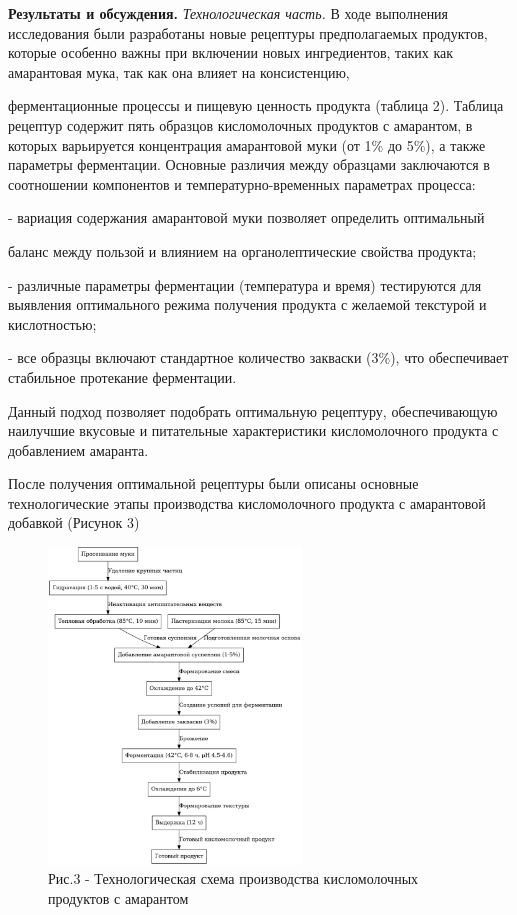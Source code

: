 \begin{multicols}{2}
{\bfseries Результаты и обсуждения.} \emph{Технологическая часть.} В ходе
выполнения исследования были разработаны новые рецептуры предполагаемых
продуктов, которые особенно важны при включении новых ингредиентов,
таких как амарантовая мука, так как она влияет на консистенцию,

ферментационные процессы и пищевую ценность продукта (таблица 2).
Таблица рецептур содержит пять образцов кисломолочных продуктов с
амарантом, в которых варьируется концентрация амарантовой муки (от 1\%
до 5\%), а также параметры ферментации. Основные различия между
образцами заключаются в соотношении компонентов и температурно-временных
параметрах процесса:

- вариация содержания амарантовой муки позволяет определить оптимальный

баланс между пользой и влиянием на органолептические свойства продукта;

- различные параметры ферментации (температура и время) тестируются для
выявления оптимального режима получения продукта с желаемой текстурой и
кислотностью;

- все образцы включают стандартное количество закваски (3\%), что
обеспечивает стабильное протекание ферментации.

Данный подход позволяет подобрать оптимальную рецептуру, обеспечивающую
наилучшие вкусовые и питательные характеристики кисломолочного продукта
с добавлением амаранта.

После получения оптимальной рецептуры были описаны основные
технологические этапы производства кисломолочного продукта с амарантовой
добавкой (Рисунок 3)
\end{multicols}

\begin{figure}[H]
	\centering
	\includegraphics[width=0.6\textwidth]{media/pish2/image22}
	\caption*{Рис.3 - Технологическая схема производства кисломолочных продуктов с амарантом}
\end{figure}

